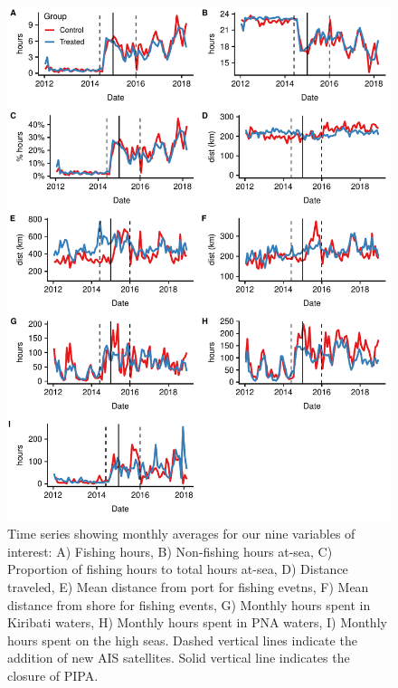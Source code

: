 \documentclass[9p,twocolumn,twoside,lineno]{pnas-new}
\begin{document}
\begin{figure}
\centering
\includegraphics{img/all_panels.pdf}
\caption{\label{fig:all_panels}Time series showing monthly averages for our nine variables of interest: A) Fishing hours, B) Non-fishing hours at-sea, C) Proportion of fishing hours to total hours at-sea, D) Distance traveled, E) Mean distance from port for fishing evetns, F) Mean distance from shore for fishing events, G) Monthly hours spent in Kiribati waters, H) Monthly hours spent in PNA waters, I) Monthly hours spent on the high seas. Dashed vertical lines indicate the addition of new AIS satellites. Solid vertical line indicates the closure of PIPA.}
\end{figure}
\end{document}
